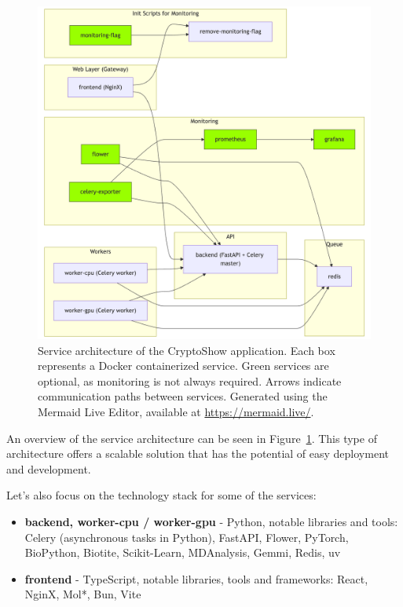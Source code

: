 \begin{figure}[htpb]
    \centering
    \includegraphics[width=\textwidth]{img/architecture.png}
    \caption{Service architecture of the CryptoShow application. Each box represents a Docker containerized service. Green services are optional, as monitoring is not always required. Arrows indicate communication paths between services. Generated using the Mermaid Live Editor, available at \url{https://mermaid.live/}.}
    \label{fig:architecture}
\end{figure}

An overview of the service architecture can be seen in Figure~\ref{fig:architecture}. This type of architecture offers a scalable solution that has the potential of easy deployment and development.

Let's also focus on the technology stack for some of the services:

\begin{itemize}
    \item \textbf{backend, worker-cpu / worker-gpu} - Python, notable libraries and tools: Celery (asynchronous tasks in Python), FastAPI, Flower, PyTorch, BioPython, Biotite, Scikit-Learn, MDAnalysis, Gemmi, Redis, uv
    \item \textbf{frontend} - TypeScript, notable libraries, tools and frameworks: React, NginX, Mol*, Bun, Vite
\end{itemize}

